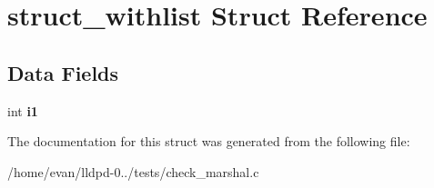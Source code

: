 \section{struct\-\_\-withlist \-Struct \-Reference}
\label{structstruct__withlist}
\subsection*{\-Data \-Fields}
\begin{DoxyCompactItemize}
\item 
int {\bfseries i1}\label{structstruct__withlist_ac1148b6c7c73300331ae93335f42241d}

\end{DoxyCompactItemize}


\-The documentation for this struct was generated from the following file\-:\begin{DoxyCompactItemize}
\item 
/home/evan/lldpd-\/0../tests/check\-\_\-marshal.\-c\end{DoxyCompactItemize}
